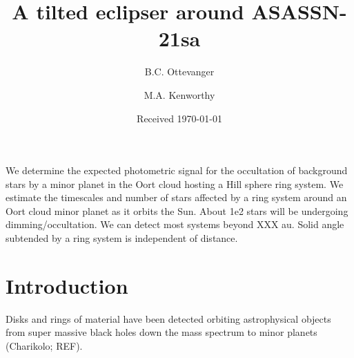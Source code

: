 \documentclass[]{aa} %
\begin{document}
   \title{A tilted eclipser around ASASSN-21sa}

   \author{B.C. Ottevanger \and 
   M.A. Kenworthy
          }
             
   \date{Received \today}

 
  \abstract
  {}  
   {We determine the expected photometric signal for the occultation of background stars by a minor planet in the Oort cloud hosting a Hill sphere ring system.}
   {We estimate the timescales and number of stars affected by a ring system around an Oort cloud minor planet as it orbits the Sun.}
   {About 1e2 stars will be undergoing dimming/occultation. We can detect most systems beyond XXX au.
   Solid angle subtended by a ring system is independent of distance.
   }
   {}


   \maketitle
%

\section{Introduction}\label{sec:intro}

Disks and rings of material have been detected orbiting astrophysical objects from super massive black holes down the mass spectrum to minor planets (Charikolo; REF).

\end{document}
